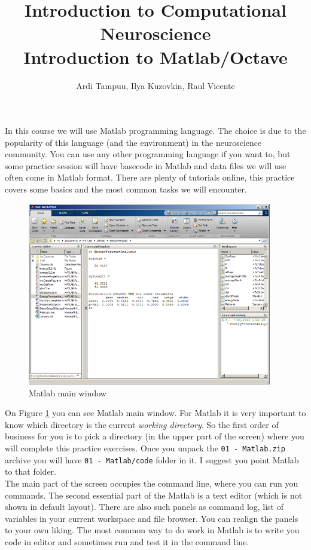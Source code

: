 \documentclass[a4paper,11pt]{article}
\author{\large{Ardi Tampuu, Ilya Kuzovkin, Raul Vicente}}
\title{\huge{Introduction to Computational Neuroscience}\\\LARGE{Introduction to Matlab/Octave}}
\begin{document}
\maketitle

In this course we will use Matlab programming language. The choice is due to the popularity of this language (and the environment) in the neuroscience community. You can use any other programming language if you want to, but some practice session will have basecode in Matlab and data files we will use often come in Matlab format. There are plenty of tutorials online, this practice covers some basics and the most common tasks we will encounter.
\ \\


%
%
\begin{figure}[H]
   \centering
   \includegraphics[width=0.95\textwidth]{matlab.png} 
   \caption{Matlab main window}
   \label{fig:matlabgui}
\end{figure}
On Figure \ref{fig:matlabgui} you can see Matlab main window. For Matlab it is very important to know which directory is the current \emph{working directory}. So the first order of business for you is to pick a directory (in the upper part of the screen) where you will complete this practice exercises. Once you unpack the \texttt{01 - Matlab.zip} archive you will have \texttt{01 - Matlab/code} folder in it. I suggest you point Matlab to that folder.\\

The main part of the screen occupies the command line, where you can run you commands. The second essential part of the Matlab is a text editor (which is not shown in default layout). There are also such panels as command log, list of variables in your current workspace and file browser. You can realign the panels to your own liking. The most common way to do work in Matlab is to write you code in editor and sometimes run and test it in the command line.\\
\end{document}
